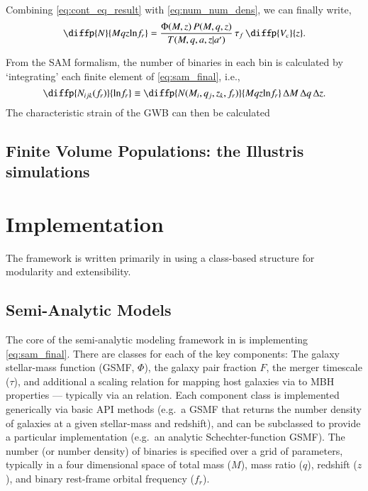 \documentclass[useAMS, usenatbib]{mnras}
\begin{document}
        Combining \eqref{eq:cont_eq_result} with \eqref{eq:num_num_dens}, we can finally write,
        \begin{equation}
            \label{eq:sam_final}
            \diffp{N}{{M}{q}{z}{\ln\!f_r}} = \frac{\Phi(M,z) \, P(M,q,z)}{T(M,q,a,z|a')} \, \thardf \, \diffp{V_c}{z}.
        \end{equation}

        From the SAM formalism, the number of binaries in each bin is calculated by `integrating' each finite element of \eqref{eq:sam_final}, i.e.,
        \begin{equation}
            \diffp{N_{ijk}(f_r)}{{\ln\!f_r}} \equiv \diffp{N(M_i, q_j, z_k, {f_r})}{{M}{q}{z}{\ln\!f_r}} \, \Delta M \,\Delta q \, \Delta z.
        \end{equation}
        The characteristic strain of the GWB can then be calculated

    \subsection{Finite Volume Populations: the Illustris simulations}




\section{Implementation}
    \label{sec:imp}

    The \holodeck{} framework is written primarily in \python{} using a class-based structure for modularity and extensibility.

    \subsection{Semi-Analytic Models}
        \label{sec:imp_sam}

        The core of the semi-analytic modeling framework in \holodeck{} is implementing \eqref{eq:sam_final}.  There are classes for each of the key components: The galaxy stellar-mass function (GSMF, $\Phi$), the galaxy pair fraction \(F\), the merger timescale ($\tau$), and additional a scaling relation for mapping host galaxies via to MBH properties --- typically via an \mmbulge{} relation.  Each component class is implemented generically via basic API methods (e.g.~a GSMF that returns the number density of galaxies at a given stellar-mass and redshift), and can be subclassed to provide a particular implementation (e.g.~an analytic Schechter-function GSMF).  The number (or number density) of binaries is specified over a grid of parameters, typically in a four dimensional space of total mass ($M$), mass ratio ($q$), redshift ($z$), and binary rest-frame orbital frequency ($f_r$).
\end{document}
